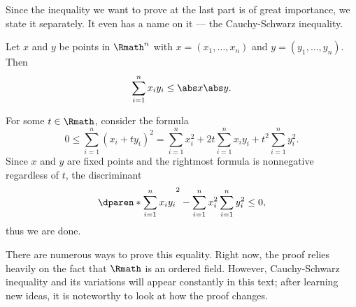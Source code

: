 Since the inequality we want to prove at the last part
is of great importance,
we state it separately.
It even has a name on it --- the Cauchy-Schwarz inequality.

\begin{theorem}
    \label{thm:CSI}

    Let \(x\) and \(y\) be points in \(\Rmath^n\)
    with \(x=(x_1,\dots,x_n)\) and \(y=(y_1,\dots,y_n)\).
    Then
    \[
        \sum_{i=1}^{n}x_iy_i\le\abs x\abs y.
    \]
\end{theorem}
\begin{myproof}
    For some \(t\in\Rmath\),
    consider the formula
    \[
        0
        \le\sum_{i=1}^{n}(x_i+ty_i)^2
        =\sum_{i=1}^{n}x_i^2
            +2t\sum_{i=1}^{n}x_iy_i+t^2\sum_{i=1}^{n}y_i^2.
    \]
    Since \(x\) and \(y\) are fixed points
    and the rightmost formula is nonnegative regardless of \(t\),
    the discriminant
    \[
        \dparen*{\sum_{i=1}^{n}x_iy_i}^2
            -\sum_{i=1}^{n}x_i^2\sum_{i=1}^{n}y_i^2\le 0,
    \]
    thus we are done.
\end{myproof}

There are numerous ways to prove this equality.
Right now, the proof relies heavily on the fact
that \(\Rmath\) is an ordered field.
However, Cauchy-Schwarz inequality and its variations
will appear constantly in this text;
after learning new ideas,
it is noteworthy to look at how the proof changes.